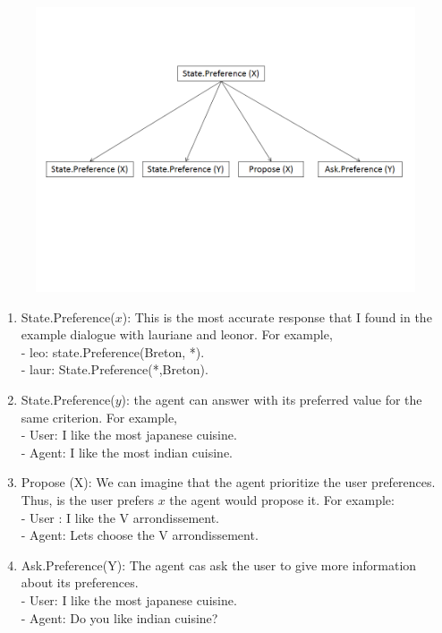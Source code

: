 \documentclass{llncs}
\begin{document}
\begin{figure}[b]
\centerline{\includegraphics[width=5in]{figs/state.PNG}}

\end{figure}
\begin{enumerate}
\item State.Preference($x$): This is the most accurate response that I found in the example dialogue with lauriane and leonor. 
For example, 
\\ - leo: state.Preference(Breton, *).
\\ - laur: State.Preference(*,Breton).

\item State.Preference($y$): the agent can answer with its preferred value for the same criterion. For example,
\\ - User: I like the most japanese cuisine.
\\ - Agent: I like the most indian cuisine.

\item Propose (X): We can imagine that the agent prioritize the user preferences. Thus, is the user prefers $x$ the agent would propose it.
For example:
\\- User : I like the V arrondissement.
\\- Agent: Lets choose the V arrondissement. 

\item Ask.Preference(Y): The agent cas ask the user to give more information about its preferences.
\\ - User: I like the most japanese cuisine.
\\ - Agent: Do you like indian cuisine? 
\end{enumerate}
\end{document}
